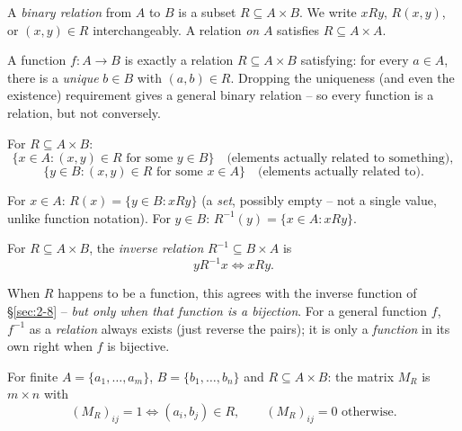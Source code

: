 \begin{definition}
A \emph{binary relation} from $A$ to $B$ is a subset $R \subseteq A \times B$. We write $x R y$, $R(x,y)$, or $(x,y) \in R$ interchangeably. A relation \emph{on} $A$ satisfies $R \subseteq A \times A$.
\end{definition}

\begin{note}
A function $f: A \to B$ is exactly a relation $R \subseteq A \times B$ satisfying: for every $a \in A$, there is a \emph{unique} $b \in B$ with $(a,b) \in R$. Dropping the uniqueness (and even the existence) requirement gives a general binary relation -- so every function is a relation, but not conversely.
\end{note}

\begin{definition}
For $R \subseteq A \times B$:
\[
\{x \in A : (x,y) \in R \text{ for some } y \in B\} \quad \text{(elements actually related to something)},
\]
\[
\{y \in B : (x,y) \in R \text{ for some } x \in A\} \quad \text{(elements actually related to)}.
\]
\end{definition}

\begin{definition}[$R(x)$, $R^{-1}(y)$ -- CN notation]
For $x \in A$: $R(x) = \{y \in B : xRy\}$ (a \emph{set}, possibly empty -- not a single value, unlike function notation). For $y \in B$: $R^{-1}(y) = \{x \in A : xRy\}$.
\end{definition}

\begin{definition}
For $R \subseteq A \times B$, the \emph{inverse relation} $R^{-1} \subseteq B \times A$ is
\[
y R^{-1} x \iff x R y.
\]
\end{definition}

\begin{note}
When $R$ happens to be a function, this agrees with the inverse function of \S\ref{sec:2-8} -- \emph{but only when that function is a bijection}. For a general function $f$, $f^{-1}$ as a \emph{relation} always exists (just reverse the pairs); it is only a \emph{function} in its own right when $f$ is bijective.
\end{note}

\begin{definition}
For finite $A=\{a_1,\dots,a_m\}$, $B=\{b_1,\dots,b_n\}$ and $R\subseteq A\times B$: the matrix $M_R$ is $m\times n$ with
\[
(M_R)_{ij} = 1 \iff (a_i,b_j)\in R, \qquad (M_R)_{ij}=0 \text{ otherwise.}
\]
\end{definition}

